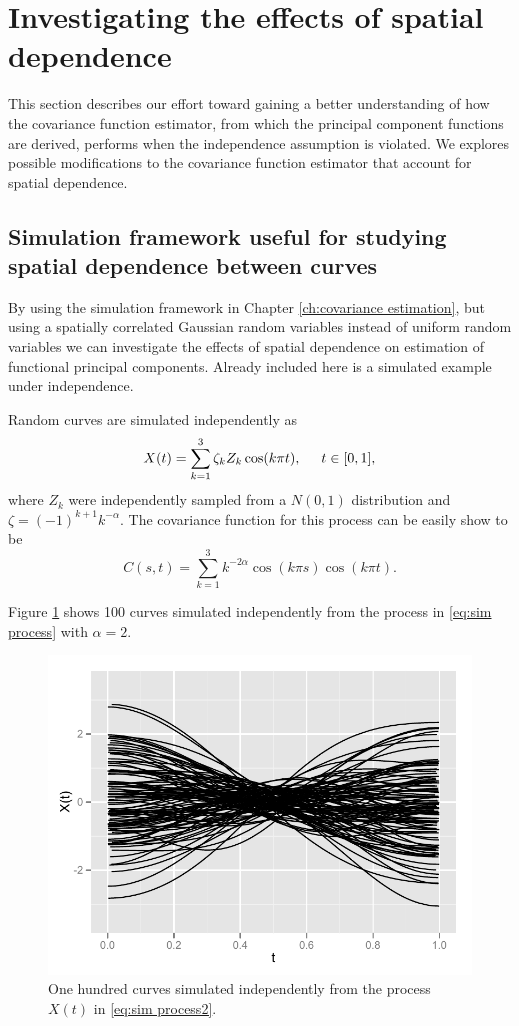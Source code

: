 

\newpage

\section{Investigating the effects of spatial dependence} 

\label{sec:investigating_the_effects_of_spatial_dependence}

This section describes our effort toward gaining a better understanding of how the covariance function estimator, from which the principal component functions are derived, performs when the independence assumption is violated. We explores possible modifications to the covariance function estimator that account for spatial dependence. 

\subsection{Simulation framework useful for studying spatial dependence between curves} By using the simulation framework in Chapter \ref{ch:covariance estimation}, but using a spatially correlated Gaussian random variables instead of uniform random variables we can investigate the effects of spatial dependence on estimation of functional principal components. Already included here is a simulated example under independence. 

Random curves are simulated independently as 
\begin{equation}
	X(t) = \sum^{3}_{k=1}\zeta_k Z_k \cos(k\pi t), \hspace{0.5cm} t \in [0,1], \label{eq:sim process2} 
\end{equation}
where $Z_k$ were independently sampled from a $N(0,1)$ distribution and \(\zeta=(-1)^{k+1}k^{-\alpha}\). The covariance function for this process can be easily show to be 
\begin{equation}
	C(s,t) = \sum^{3}_{k=1}k^{-2\alpha} \cos(k\pi s)\cos(k\pi t). 
\end{equation}

Figure \ref{fig:sim curves2} shows 100 curves simulated independently from the process in \eqref{eq:sim process} with $\alpha=2$. 

\begin{figure}
	\begin{center}
		\includegraphics[width=0.5
		\textwidth]{images/Ch3/sim-curves.pdf} 
	\end{center}
	\caption{One hundred curves simulated independently from the process $X(t)$ in \eqref{eq:sim process2}.} \label{fig:sim curves2} 
\end{figure}

